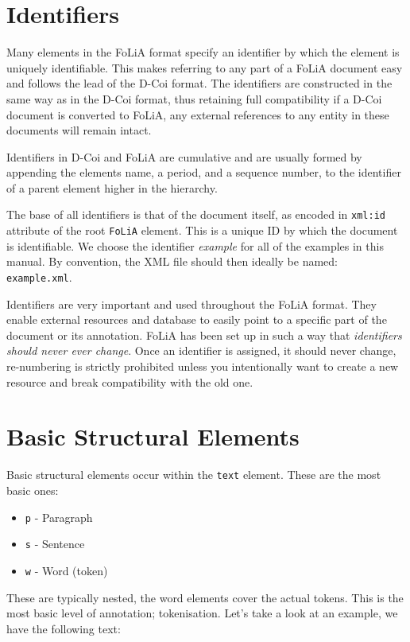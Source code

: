 \documentclass[a4paper,12pt]{report}
\begin{document}
\section{Identifiers}

Many elements in the FoLiA format specify an identifier by which the element is uniquely identifiable. This makes referring to any part of a FoLiA document easy and follows the lead of the D-Coi format. The identifiers are constructed in the same way as in the D-Coi format, thus retaining full compatibility if a D-Coi document is converted to FoLiA, any external references to any entity in these documents will remain intact.

Identifiers in D-Coi and FoLiA are cumulative and are usually formed by appending the elements name, a period, and a sequence number, to the identifier of a parent element higher in the hierarchy.

The base of all identifiers is that of the document itself, as encoded in \texttt{xml:id} attribute of the root \texttt{FoLiA} element. This is a unique ID by which the document is identifiable. We choose the identifier \emph{example} for all of the examples in this manual. By convention, the XML file should then ideally be named: \texttt{example.xml}.

Identifiers are very important and used throughout the FoLiA format. They enable external resources and database to easily point to a specific part of the document or its annotation. FoLiA has been set up in such a way that \emph{identifiers should never ever change}. Once an identifier is assigned, it should never change, re-numbering is strictly prohibited unless you intentionally want to create a new resource and break compatibility with the old one.


\section{Basic Structural Elements}
\label{sec:basics}

Basic structural elements occur within the \texttt{text} element. These are the most basic ones:

\begin{itemize}
\item \texttt{p} - Paragraph
\item \texttt{s} - Sentence
\item \texttt{w} - Word (token)
\end{itemize}

These are typically nested, the word elements cover the actual tokens. This is the most basic level of annotation; tokenisation. Let's take a look at an example, we have the following text:
\end{document}
